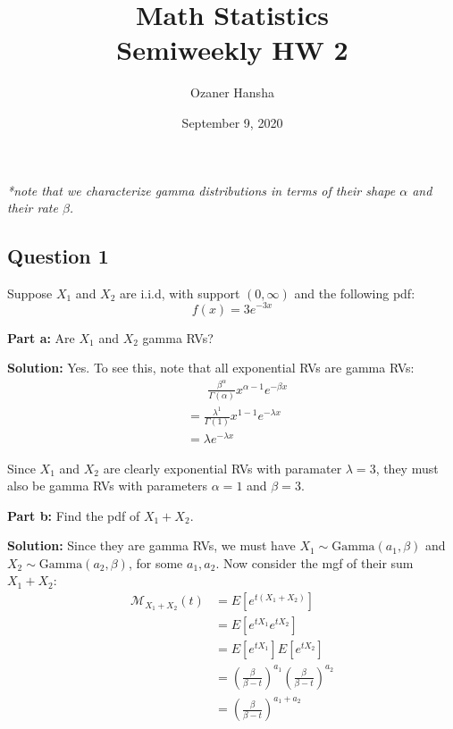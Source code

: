 \documentclass{article}
\begin{document}
\title{Math Statistics\\ Semiweekly HW 2}
\author{Ozaner Hansha}
\date{September 9, 2020}
\maketitle

\textit{*note that we characterize gamma distributions in terms of their shape $\alpha$ and their rate $\beta$.}

\subsection*{Question 1}
Suppose $X_1$ and $X_2$ are i.i.d, with support $(0,\infty)$ and the following pdf:
$$f(x)=3e^{-3x}$$
\smallskip

\noindent\textbf{Part a:} Are $X_1$ and $X_2$ gamma RVs?
\bigskip

\noindent\textbf{Solution:} Yes. To see this, note that all exponential RVs are gamma RVs:
\begin{align*}
  &\phantom{=\,\,}\frac{\beta^\alpha}{\Gamma(\alpha)}x^{\alpha-1}e^{-\beta x}\tag{pdf of gamma RV}\\
  &=\frac{\lambda^1}{\Gamma(1)}x^{1-1}e^{-\lambda x}\tag{let $\alpha=1$ and $\beta=\lambda$}\\
  &=\lambda e^{-\lambda x}\tag{pdf of exponential RV}
\end{align*}

Since $X_1$ and $X_2$ are clearly exponential RVs with paramater $\lambda=3$, they must also be gamma RVs with parameters $\alpha=1$ and $\beta=3$.
\bigskip


\noindent\textbf{Part b:} Find the pdf of $X_1+X_2$.
\bigskip

\noindent\textbf{Solution:} Since they are gamma RVs, we must have $X_1\sim\text{Gamma}(a_1,\beta)$ and $X_2\sim\text{Gamma}(a_2,\beta)$, for some $a_1,a_2$. Now consider the mgf of their sum $X_1+X_2$:
\begin{align*}
  \mathcal M_{X_1+X_2}(t)&=E[e^{t(X_1+X_2)}]\tag{def. of mgf}\\
  &=E[e^{tX_1}e^{tX_2}]\tag{power rule}\\
  &=E[e^{tX_1}]E[e^{tX_2}]\tag{independence of $X_1$ and $X_2$}\\
  &=\left(\frac{\beta}{\beta-t}\right)^{a_1}\left(\frac{\beta}{\beta-t}\right)^{a_2}\tag{mgf of a gamma RV}\\
  &=\left(\frac{\beta}{\beta-t}\right)^{a_1+a_2}\tag{power rule}
\end{align*}
\end{document}
